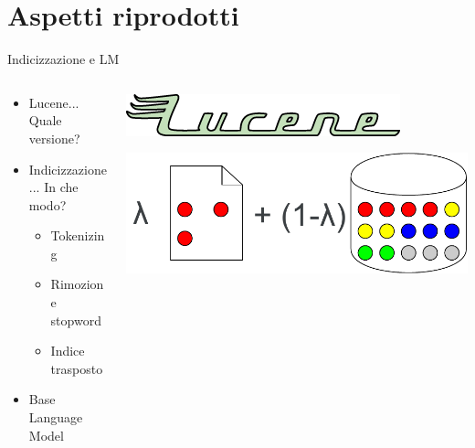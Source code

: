 \section{Aspetti riprodotti}
\begin{frame}{Indicizzazione e LM}
    \begin{columns}
        \begin{column}{0.5\textwidth}
            \begin{itemize}
                \item Lucene... Quale versione?
            \end{itemize}
            \bigskip
            \begin{itemize}
                \item Indicizzazione... In che modo?
                      \begin{itemize}
                          \item Tokenizing
                          \item Rimozione stopword
                          \item Indice trasposto
                      \end{itemize}
            \end{itemize}
            \bigskip
            \begin{itemize}
                \item Base Language Model
            \end{itemize}
        \end{column}
        \begin{column}{0.5\textwidth}

            \bigskip
            \includegraphics[width=\columnwidth]{img/lucene_logo.png}
            
            \bigskip
            \bigskip
            \bigskip
            \bigskip
            \bigskip
            \bigskip
            \includegraphics[width=\columnwidth]{img/lm.pdf}
        \end{column}
    \end{columns}
\end{frame}

